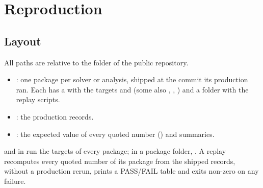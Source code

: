 \section{Reproduction}\label{sec:repro}

\subsection{Layout}
All paths are relative to the folder  of the public repository.
\begin{itemize}
\item {}: one package per solver or analysis, shipped at the commit its production ran. Each has a
  with the targets  and  (some also , ,
 ) and a  folder with the replay scripts.
\item {}: the production records.
\item {}: the expected value of every quoted number () and summaries.
\end{itemize}
 and  in  run the targets of every package; in a package folder,
. A replay recomputes every quoted number of its package from the shipped records,
without a production rerun, prints a PASS/FAIL table and exits non-zero on any failure.

